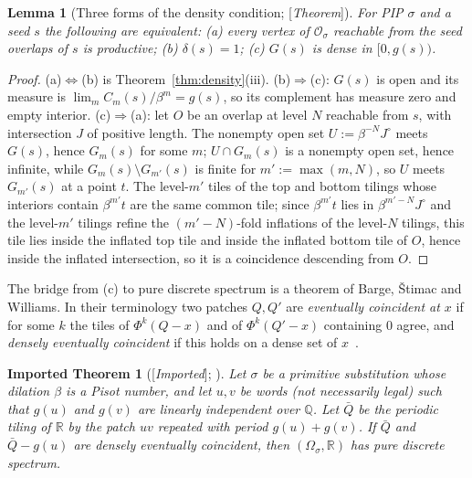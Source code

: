 \documentclass[11pt]{amsart}
\theoremstyle{plain}
\newtheorem{lemma}[theorem]{Lemma}
\newtheorem{importedtheorem}[theorem]{Imported Theorem}
\theoremstyle{definition}
\theoremstyle{remark}
\newcommand{\Q}{\mathbb{Q}}
\newcommand{\R}{\mathbb{R}}
\newcommand{\PDS}{pure discrete spectrum}
\newcommand{\Status}[1]{\textup{[\textit{#1}]}}
\begin{document}
\begin{lemma}[Three forms of the density condition; \Status{Theorem}]\label{lem:three-forms}
For PIP $\sigma$ and a seed $s$ the following are equivalent: \textup{(a)} every vertex of $\mathcal O_\sigma$ reachable from the seed overlaps of $s$ is productive; \textup{(b)} $\delta(s)=1$; \textup{(c)} $G(s)$ is dense in $[0,g(s))$.
\end{lemma}
\begin{proof}
(a)$\Leftrightarrow$(b) is Theorem~\ref{thm:density}(iii). (b)$\Rightarrow$(c): $G(s)$ is open and its measure is $\lim_mC_m(s)/\beta^m=g(s)$, so its complement has measure zero and empty interior. (c)$\Rightarrow$(a): let $O$ be an overlap at level $N$ reachable from $s$, with intersection $J$ of positive length. The nonempty open set $U:=\beta^{-N}J^\circ$ meets $G(s)$, hence $G_m(s)$ for some $m$; $U\cap G_m(s)$ is a nonempty open set, hence infinite, while $G_m(s)\setminus G_{m'}(s)$ is finite for $m':=\max(m,N)$, so $U$ meets $G_{m'}(s)$ at a point $t$. The level-$m'$ tiles of the top and bottom tilings whose interiors contain $\beta^{m'}t$ are the same common tile; since $\beta^{m'}t$ lies in $\beta^{m'-N}J^\circ$ and the level-$m'$ tilings refine the $(m'-N)$-fold inflations of the level-$N$ tilings, this tile lies inside the inflated top tile and inside the inflated bottom tile of $O$, hence inside the inflated intersection, so it is a coincidence descending from $O$.
\end{proof}

The bridge from (c) to \PDS{} is a theorem of Barge, \v{S}timac and Williams. In their terminology two patches $Q,Q'$ are \emph{eventually coincident at $x$} if for some $k$ the tiles of $\Phi^k(Q-x)$ and of $\Phi^k(Q'-x)$ containing $0$ agree, and \emph{densely eventually coincident} if this holds on a dense set of $x$~\cite[\S3]{BSW}.

\begin{importedtheorem}[\Status{Imported}; {\cite[Thm.~3.1 and proof of Thm.~3.2]{BSW}}]\label{thm:bsw}
Let $\sigma$ be a primitive substitution whose dilation $\beta$ is a Pisot number, and let $u,v$ be words (not necessarily legal) such that $g(u)$ and $g(v)$ are linearly independent over $\Q$. Let $\bar Q$ be the periodic tiling of $\R$ by the patch $uv$ repeated with period $g(u)+g(v)$. If $\bar Q$ and $\bar Q-g(u)$ are densely eventually coincident, then $(\Omega_\sigma,\R)$ has \PDS{}.
\end{importedtheorem}
\end{document}

